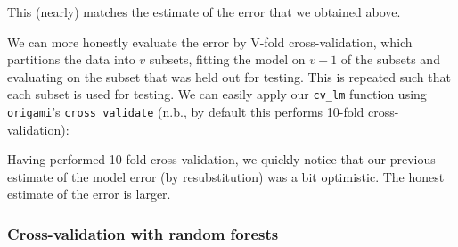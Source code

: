 \documentclass[12pt, krantz2,]{krantz}
\newenvironment{Shaded}{\begin{snugshade}}{\end{snugshade}}
\newcommand{\CommentTok}[1]{\textcolor[rgb]{0.37,0.37,0.37}{\textit{#1}}}
\newcommand{\DataTypeTok}[1]{\textcolor[rgb]{0.27,0.27,0.27}{#1}}
\newcommand{\DecValTok}[1]{\textcolor[rgb]{0.06,0.06,0.06}{#1}}
\newcommand{\KeywordTok}[1]{\textcolor[rgb]{0.27,0.27,0.27}{\textbf{#1}}}
\newcommand{\NormalTok}[1]{#1}
\newcommand{\OperatorTok}[1]{\textcolor[rgb]{0.43,0.43,0.43}{\textbf{#1}}}
\newcommand{\OtherTok}[1]{\textcolor[rgb]{0.37,0.37,0.37}{#1}}
\newcommand{\StringTok}[1]{\textcolor[rgb]{0.5,0.5,0.5}{#1}}
\theoremstyle{definition}
\theoremstyle{definition}
\theoremstyle{definition}
\newcommand{\1}{\mathbbm{1}}
\begin{document}
\begin{Shaded}
\end{Shaded}

This (nearly) matches the estimate of the error that we obtained above.

We can more honestly evaluate the error by V-fold cross-validation, which
partitions the data into \(v\) subsets, fitting the model on \(v - 1\) of the
subsets and evaluating on the subset that was held out for testing. This is
repeated such that each subset is used for testing. We can easily apply our
\texttt{cv\_lm} function using \texttt{origami}'s \texttt{cross\_validate} (n.b., by default this
performs 10-fold cross-validation):

\begin{Shaded}
\end{Shaded}

Having performed 10-fold cross-validation, we quickly notice that our previous
estimate of the model error (by resubstitution) was a bit optimistic. The honest
estimate of the error is larger.

\hypertarget{cross-validation-with-random-forests}{%
\subsubsection{Cross-validation with random forests}\label{cross-validation-with-random-forests}}
\end{document}

